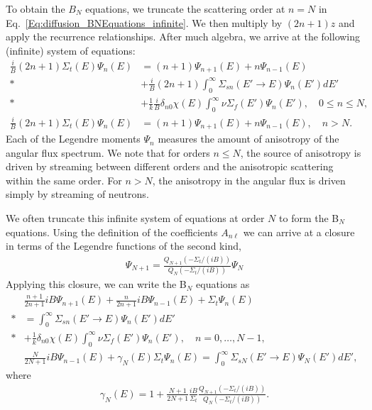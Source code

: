 To obtain the $B_N$ equations, we truncate the scattering order at $n = N$ in Eq.~\eqref{Eq:diffusion_BNEquations_infinite}. We then multiply by $(2n + 1)z$ and apply the recurrence relationships. After much algebra, we arrive at the following (infinite) system of equations:
\begin{subequations}
\begin{align}
  \frac{i}{B} ( 2n + 1 ) \Sigma_t(E) \Psi_{n}(E) 
  &= (n+1) \Psi_{n+1}(E) + n \Psi_{n-1}(E) \nonumber \\*
  &+ \frac{i}{B} ( 2n + 1 ) \int_0^\infty \Sigma_{sn}(E' \rightarrow E) \Psi_n(E') dE' \nonumber \\*
  &+ \frac{1}{k} \frac{i}{B} \delta_{n0} \chi(E) \int_0^\infty \nu\Sigma_f(E') \Psi_n(E') , \quad 0 \le n \le N, \\
\frac{i}{B} ( 2n + 1 ) \Sigma_t(E) \Psi_{n}(E) &= (n+1) \Psi_{n+1}(E) + n \Psi_{n-1}(E)  , \quad n > N .
\end{align}
\end{subequations}
Each of the Legendre moments $\Psi_n$ measures the amount of anisotropy of the angular flux spectrum. We note that for orders $n \le N$, the source of anisotropy is driven by streaming between different orders and the anisotropic scattering within the same order. For $n > N$, the anisotropy in the angular flux is driven simply by streaming of neutrons.

We often truncate this infinite system of equations at order $N$ to form the B$_N$ equations. Using the definition of the coefficients $A_{n\ell}$ we can arrive at a closure in terms of the Legendre functions of the second kind,
\begin{align}
  \Psi_{N+1} = \frac{ Q_{N+1}( -\Sigma_t / (iB) ) }{ Q_{N}( -\Sigma_t / (iB) ) } \Psi_N
\end{align}
Applying this closure, we can write the B$_N$ equations as
\begin{align}
  &\frac{ n + 1 }{ 2n + 1 } i B \Psi_{n+1}(E) + \frac{ n }{ 2n + 1 }  i B \Psi_{n-1}(E) + \Sigma_t \Psi_n(E) \nonumber \\*
  &= \int_0^\infty \Sigma_{sn}(E' \rightarrow E) \Psi_n(E') dE' \nonumber \\*
  &+ \frac{1}{k} \delta_{n0} \chi(E) \int_0^\infty \nu\Sigma_f(E') \Psi_n(E') , \quad n = 0, \ldots, N-1, \nonumber \\
  &\frac{ N }{ 2N + 1 }  i B \Psi_{n-1}(E) + \gamma_N(E) \Sigma_t \Psi_n(E) = \int_0^\infty \Sigma_{sN}(E' \rightarrow E) \Psi_N(E') dE' ,
\end{align}
where
\begin{align}
  \gamma_N(E) = 1 + \frac{ N + 1 }{ 2N + 1 } \frac{iB}{\Sigma_t} \frac{ Q_{N+1}(-\Sigma_t/(iB)) }{ Q_{N}(-\Sigma_t/(iB)) } .
\end{align}

